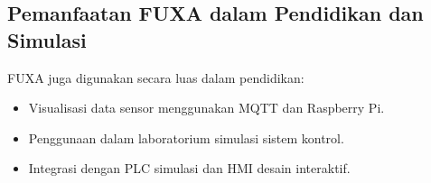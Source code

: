 \subsection{Pemanfaatan FUXA dalam Pendidikan dan Simulasi}
FUXA juga digunakan secara luas dalam pendidikan:

\begin{itemize}
    \item Visualisasi data sensor menggunakan MQTT dan Raspberry Pi.
    \item Penggunaan dalam laboratorium simulasi sistem kontrol.
    \item Integrasi dengan PLC simulasi dan HMI desain interaktif.
\end{itemize}

